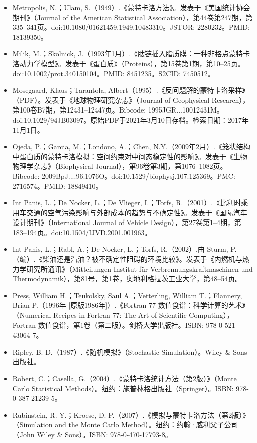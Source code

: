 \begin{itemize}
\item Metropolis, N.；Ulam, S.（1949）.《蒙特卡洛方法》。发表于《美国统计协会期刊》（Journal of the American Statistical Association），第44卷第247期，第335–341页。doi:10.1080/01621459.1949.10483310。JSTOR: 2280232。PMID: 18139350。
\item Milik, M.；Skolnick, J.（1993年1月）.《肽链插入脂质膜：一种非格点蒙特卡洛动力学模型》。发表于《蛋白质》（Proteins），第15卷第1期，第10–25页。doi:10.1002/prot.340150104。PMID: 8451235。S2CID: 7450512。
\item Mosegaard, Klaus；Tarantola, Albert（1995）.《反问题解的蒙特卡洛采样》（PDF）。发表于《地球物理研究杂志》（Journal of Geophysical Research），第100卷B7期，第12431–12447页。Bibcode: 1995JGR...10012431M。doi:10.1029/94JB03097。原始PDF于2021年3月10日存档。检索日期：2017年11月1日。
\item Ojeda, P.；Garcia, M.；Londono, A.；Chen, N.Y.（2009年2月）.《笼状结构中蛋白质的蒙特卡洛模拟：空间约束对中间态稳定性的影响》。发表于《生物物理学杂志》（Biophysical Journal），第96卷第3期，第1076–1082页。Bibcode: 2009BpJ....96.1076O。doi:10.1529/biophysj.107.125369。PMC: 2716574。PMID: 18849410。
\item Int Panis, L.；De Nocker, L.；De Vlieger, I.；Torfs, R.（2001）.《比利时乘用车交通的空气污染影响与外部成本的趋势与不确定性》。发表于《国际汽车设计期刊》（International Journal of Vehicle Design），第27卷第1–4期，第183–194页。doi:10.1504/IJVD.2001.001963。
\item Int Panis, L.；Rabl, A.；De Nocker, L.；Torfs, R.（2002）.由 Sturm, P.（编）.《柴油还是汽油？被不确定性阻碍的环境比较》。发表于《内燃机与热力学研究所通讯》（Mitteilungen Institut für Verbrennungskraftmaschinen und Thermodynamik），第81号，第1卷，奥地利格拉茨工业大学，第48–54页。
\item Press, William H.；Teukolsky, Saul A.；Vetterling, William T.；Flannery, Brian P.（1996年 [原版1986年]）.《Fortran 77 数值食谱：科学计算的艺术》（Numerical Recipes in Fortran 77: The Art of Scientific Computing），Fortran 数值食谱，第1卷（第二版）。剑桥大学出版社。ISBN: 978-0-521-43064-7。
\item Ripley, B. D.（1987）.《随机模拟》（Stochastic Simulation）。Wiley & Sons 出版社。
\item Robert, C.；Casella, G.（2004）.《蒙特卡洛统计方法（第2版）》（Monte Carlo Statistical Methods）。纽约：施普林格出版社（Springer）。ISBN: 978-0-387-21239-5。
\item Rubinstein, R. Y.；Kroese, D. P.（2007）.《模拟与蒙特卡洛方法（第2版）》（Simulation and the Monte Carlo Method）。纽约：约翰·威利父子公司（John Wiley & Sons）。ISBN: 978-0-470-17793-8。

\end{itemize}
